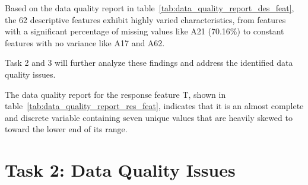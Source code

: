\documentclass[11pt]{report}
\begin{document}
Based on the data quality report in table~\ref{tab:data_quality_report_des_feat}, the 62 descriptive features exhibit highly varied characteristics,
from features with a significant percentage of missing values like A21 (70.16\%) to constant features with no variance like A17 and A62.

Task 2 and 3 will further analyze these findings and address the identified data quality issues.

\begin{table}[H]
\centering
\caption{Data Quality Report for the Response Feature.}
\label{tab:data_quality_report_res_feat}
\end{table}

The data quality report for the response feature T, shown in table~\ref{tab:data_quality_report_res_feat}, indicates that it is an almost complete and discrete variable containing seven unique values
that are heavily skewed to toward the lower end of its range.


\section*{Task 2: Data Quality Issues}
\end{document}
